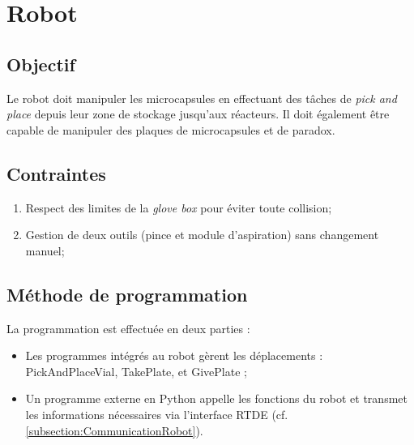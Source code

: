 \section{Robot}

\subsection{Objectif}
Le robot doit manipuler les \glspl{microcapsule} en effectuant des tâches de \textit{pick and place} depuis leur zone de stockage jusqu'aux réacteurs. Il doit également être capable de manipuler des plaques de \glspl{microcapsule} et de \gls{paradox}.

\subsection{Contraintes}
\begin{enumerate}
    \item Respect des limites de la \textit{glove box} pour éviter toute collision;
    \item Gestion de deux outils (pince et module d'aspiration) sans changement manuel;
\end{enumerate}

\subsection{Méthode de programmation}
La programmation est effectuée en deux parties :
\begin{itemize}
    \item Les programmes intégrés au robot gèrent les déplacements : \og{}PickAndPlaceVial\fg{}, \og{}TakePlate\fg{}, et \og{}GivePlate\fg{} ;
    \item Un programme externe en Python appelle les fonctions du robot et transmet les informations nécessaires via l'interface RTDE (cf. \autoref{subsection:CommunicationRobot}).
\end{itemize}

